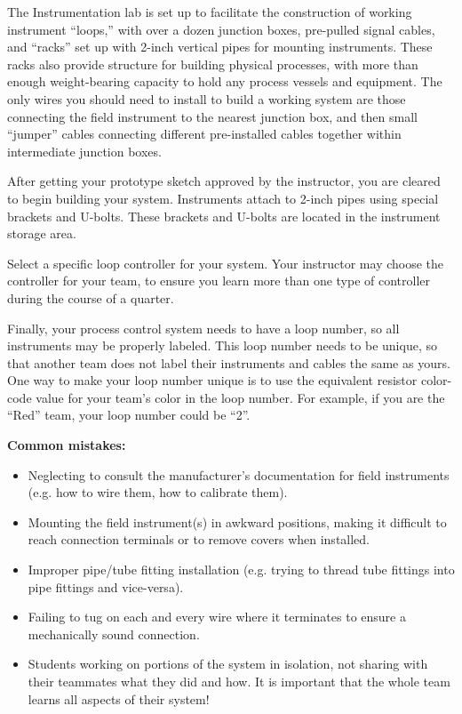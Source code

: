 \documentclass[12pt,a4paper]{article}
\begin{document}
The Instrumentation lab is set up to facilitate the construction of working instrument ``loops,'' with over a dozen junction boxes, pre-pulled signal cables, and ``racks'' set up with 2-inch vertical pipes for mounting instruments.  These racks also provide structure for building physical processes, with more than enough weight-bearing capacity to hold any process vessels and equipment.  The only wires you should need to install to build a working system are those connecting the field instrument to the nearest junction box, and then small ``jumper'' cables connecting different pre-installed cables together within intermediate junction boxes.

After getting your prototype sketch approved by the instructor, you are cleared to begin building your system.  Instruments attach to 2-inch pipes using special brackets and U-bolts.  These brackets and U-bolts are located in the instrument storage area.  

Select a specific loop controller for your system.  Your instructor may choose the controller for your team, to ensure you learn more than one type of controller during the course of a quarter.

Finally, your process control system needs to have a loop number, so all instruments may be properly labeled.  This loop number needs to be unique, so that another team does not label their instruments and cables the same as yours.  One way to make your loop number unique is to use the equivalent resistor color-code value for your team's color in the loop number.  For example, if you are the ``Red'' team, your loop number could be ``2''. 

\vskip 10pt

{\bf Common mistakes:}

\begin{itemize}
\item{} Neglecting to consult the manufacturer's documentation for field instruments (e.g. how to wire them, how to calibrate them).
\item{} Mounting the field instrument(s) in awkward positions, making it difficult to reach connection terminals or to remove covers when installed.
\item{} Improper pipe/tube fitting installation (e.g. trying to thread tube fittings into pipe fittings and vice-versa).
\item{} Failing to tug on each and every wire where it terminates to ensure a mechanically sound connection.
\item{} Students working on portions of the system in isolation, not sharing with their teammates what they did and how.  It is important that the whole team learns all aspects of their system!
\end{itemize}
\end{document}
